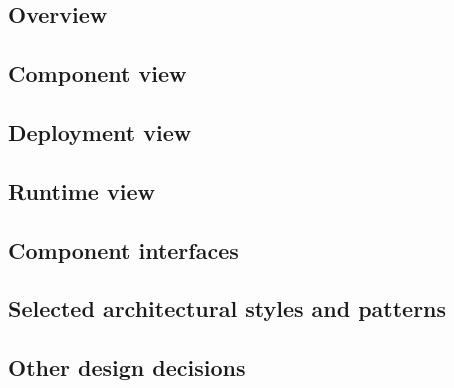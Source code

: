 \subsection{Overview}
\subsection{Component view}

\subsection{Deployment view}
\subsection{Runtime view}


\subsection{Component interfaces}

\subsection{Selected architectural styles and patterns}
\subsection{Other design decisions}

